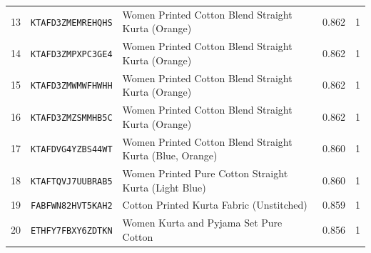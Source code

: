 \documentclass[11pt,a4paper]{article}
\begin{document}
\begin{table}[htbp]
\begin{tabular}{rlp{7.2cm}rc}
    13 & \texttt{KTAFD3ZMEMREHQHS} & Women Printed Cotton Blend Straight Kurta (Orange) & 0.862 & 1 \\
    14 & \texttt{KTAFD3ZMPXPC3GE4} & Women Printed Cotton Blend Straight Kurta (Orange) & 0.862 & 1 \\
    15 & \texttt{KTAFD3ZMWMWFHWHH} & Women Printed Cotton Blend Straight Kurta (Orange) & 0.862 & 1 \\
    16 & \texttt{KTAFD3ZMZSMMHB5C} & Women Printed Cotton Blend Straight Kurta (Orange) & 0.862 & 1 \\
    17 & \texttt{KTAFDVG4YZBS44WT} & Women Printed Cotton Blend Straight Kurta (Blue, Orange) & 0.860 & 1 \\
    18 & \texttt{KTAFTQVJ7UUBRAB5} & Women Printed Pure Cotton Straight Kurta (Light Blue) & 0.860 & 1 \\
    19 & \texttt{FABFWN82HVT5KAH2} & Cotton Printed Kurta Fabric (Unstitched) & 0.859 & 1 \\
    20 & \texttt{ETHFY7FBXY6ZDTKN} & Women Kurta and Pyjama Set Pure Cotton & 0.856 & 1 \\
    \bottomrule
  \end{tabular}
\end{table}
\end{document}
